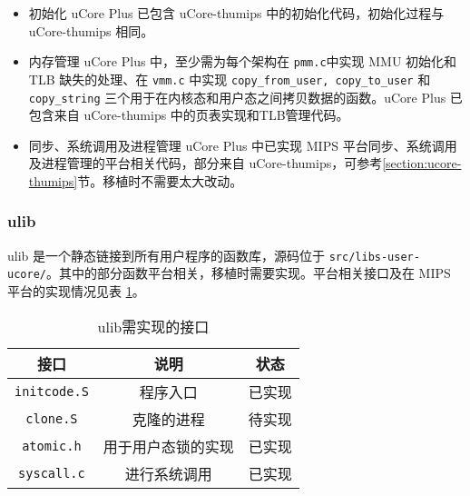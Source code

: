 \begin{itemize}
\item{初始化}
uCore Plus 已包含 uCore-thumips 中的初始化代码，初始化过程与 uCore-thumips 相同。
\item{内存管理}
uCore Plus 中，至少需为每个架构在 \texttt{pmm.c}中实现 MMU 初始化和 TLB 缺失的处理、在 \texttt{vmm.c} 中实现 \texttt{copy\_from\_user, copy\_to\_user} 和 \texttt{copy\_string} 三个用于在内核态和用户态之间拷贝数据的函数。uCore Plus 已包含来自 uCore-thumips 中的页表实现和TLB管理代码。
\item{同步、系统调用及进程管理} uCore Plus 中已实现 MIPS 平台同步、系统调用及进程管理的平台相关代码，部分来自 uCore-thumips，可参考\ref{section:ucore-thumips}节。移植时不需要太大改动。

\end{itemize}
\subsubsection{ulib}

ulib 是一个静态链接到所有用户程序的函数库，源码位于 \texttt{src/libs-user-ucore/}。其中的部分函数平台相关，移植时需要实现。平台相关接口及在 MIPS 平台的实现情况见表 \ref{table:ulib_interface}。

\begin{table}[!htbp]
\centering
\begin{tabular}{|c|c|c|}
\hline
\textbf{接口} & \textbf{说明} & \textbf{状态} \\ \hline
\texttt{initcode.S} & 程序入口 & 已实现 \\ \hline
\texttt{clone.S} & 克隆的进程 & 待实现 \\ \hline
\texttt{atomic.h} & 用于用户态锁的实现 & 已实现 \\ \hline
\texttt{syscall.c} & 进行系统调用 & 已实现 \\ \hline
\end{tabular}
    \caption{ulib需实现的接口}
    \label{table:ulib_interface}
\end{table}